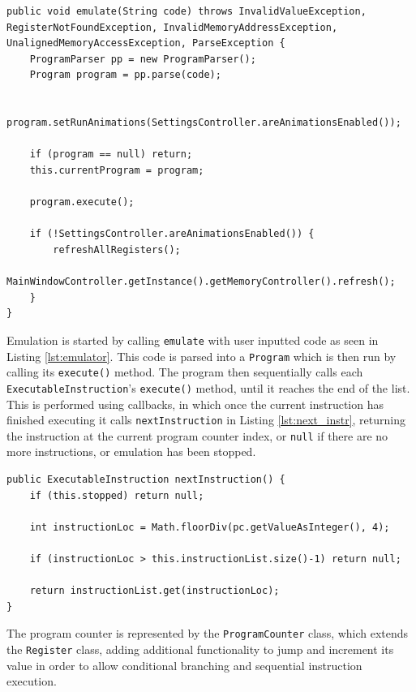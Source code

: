 \begin{lstlisting}[caption=Execute method in the Emulator Class, label=lst:emulator]
public void emulate(String code) throws InvalidValueException, RegisterNotFoundException, InvalidMemoryAddressException, UnalignedMemoryAccessException, ParseException {
    ProgramParser pp = new ProgramParser();
    Program program = pp.parse(code);

    program.setRunAnimations(SettingsController.areAnimationsEnabled());

    if (program == null) return;
    this.currentProgram = program;

    program.execute();

    if (!SettingsController.areAnimationsEnabled()) {
        refreshAllRegisters();
        MainWindowController.getInstance().getMemoryController().refresh();
    }
}
\end{lstlisting}

Emulation is started by calling \verb|emulate| with user inputted code as seen in Listing \ref{lst:emulator}. This code is parsed into a \texttt{Program} which is then run by calling its \texttt{execute()} method. The program then sequentially calls each \texttt{ExecutableInstruction}'s \verb|execute()| method, until it reaches the end of the list. This is performed using callbacks, in which once the current instruction has finished executing it calls \verb|nextInstruction| in Listing \ref{lst:next_instr}, returning the instruction at the current program counter index, or \texttt{null} if there are no more instructions, or emulation has been stopped.

\begin{lstlisting}[caption=Next instruction method in the \texttt{Program} class, label=lst:next_instr]
public ExecutableInstruction nextInstruction() {
    if (this.stopped) return null;

    int instructionLoc = Math.floorDiv(pc.getValueAsInteger(), 4);

    if (instructionLoc > this.instructionList.size()-1) return null;

    return instructionList.get(instructionLoc);
}
\end{lstlisting}

The program counter is represented by the \texttt{ProgramCounter} class, which extends the \texttt{Register} class, adding additional functionality to jump and increment its value in order to allow conditional branching and sequential instruction execution.

